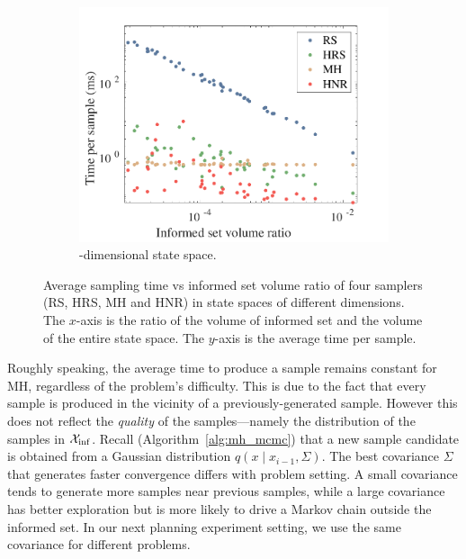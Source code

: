 \documentclass[letterpaper, 10 pt, conference]{ieeeconf}  %
\begin{document}
\begin{figure}[t!]
\begin{subfigure}[t!]{0.325\textwidth}
	\end{subfigure}
	\begin{subfigure}[t!]{0.325\textwidth}
		\centering
		\includegraphics[width=\linewidth]{fig/sampling_efficiency/sample_efficiency_6d}
		\caption{-dimensional state space.}
		\label{fig:sampling_efficiency:6d}
	\end{subfigure}
	\caption{\captionstyle Average sampling time vs informed set volume ratio of four samplers (RS, HRS, MH and HNR) in state spaces of different dimensions. 
	The $x$-axis is the ratio of the volume of informed set and the volume of the entire state space.
	The $y$-axis is the average time per sample.}
	\label{fig:sampling_efficiency}
\end{figure}

Roughly speaking, the average time to produce a sample remains constant for MH, regardless of the problem's difficulty.
This is due to the fact that every sample is produced in the vicinity of a previously-generated sample.
However this does not reflect the \emph{quality} of the samples---namely the distribution of the samples in $\mathcal{X}_{\rm {inf}}$.
Recall (Algorithm~\ref{alg:mh_mcmc}) that a new sample candidate is obtained from a Gaussian distribution $ q( x \mid x_{i-1}, \Sigma ) $.
The best covariance $ \Sigma $ that generates faster convergence differs with problem setting.
A small covariance tends to generate more samples near previous samples, while a large covariance has better exploration but is more likely to drive a Markov chain outside the informed set.
In our next planning experiment setting, we use the same covariance for different problems.
\end{document}
